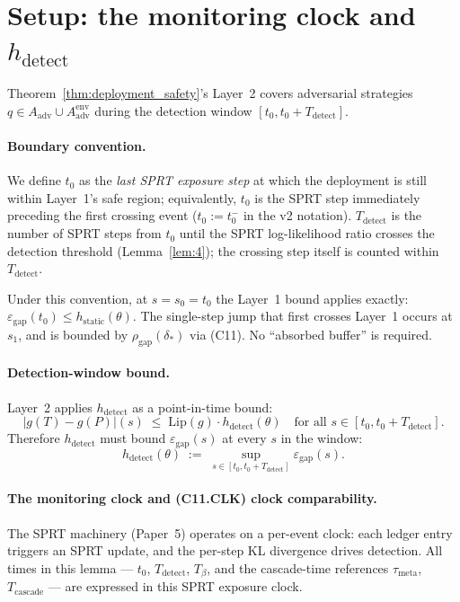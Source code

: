 \documentclass{article}
\newcommand{\Aadv}{A_{\mathrm{adv}}}
\newcommand{\deltastar}{\delta_{*}}
\newcommand{\rhogap}{\rho_{\mathrm{gap}}}
\newcommand{\Pproxy}{P}
\newcommand{\Ttruth}{T}
\newcommand{\epsgap}{\varepsilon_{\mathrm{gap}}}
\newcommand{\Tbeta}{T_{\beta}}
\begin{document}
\section{Setup: the monitoring clock and $h_{\mathrm{detect}}$}

Theorem~\ref{thm:deployment_safety}'s Layer~2 covers adversarial
strategies $q \in \Aadv \cup \Aadv^{\mathrm{env}}$ during the
detection window
$[t_0, t_0 + T_{\mathrm{detect}}]$.

\paragraph{Boundary convention.}  We define $t_0$ as the
\emph{last SPRT exposure step} at which the deployment is still
within Layer~1's safe region; equivalently, $t_0$ is the SPRT step
immediately preceding the first crossing event ($t_0 := t_0^-$ in
the v2 notation).  $T_{\mathrm{detect}}$ is the number of SPRT
steps from $t_0$ until the SPRT log-likelihood ratio crosses the
detection threshold (Lemma~\ref{lem:4}); the crossing step itself
is counted within $T_{\mathrm{detect}}$.

Under this convention, at $s = s_0 = t_0$ the Layer~1 bound applies
exactly: $\epsgap(t_0) \leq h_{\mathrm{static}}(\theta)$.  The
single-step jump that first crosses Layer~1 occurs at $s_1$, and is
bounded by $\rhogap(\deltastar)$ via (C11).  No ``absorbed buffer''
is required.

\paragraph{Detection-window bound.}
Layer~2 applies $h_{\mathrm{detect}}$ as a point-in-time bound:
\[
  |g(\Ttruth) - g(\Pproxy)|(s) \;\leq\; \mathrm{Lip}(g) \cdot
  h_{\mathrm{detect}}(\theta)
  \quad \text{for all } s \in [t_0, t_0 + T_{\mathrm{detect}}].
\]
Therefore $h_{\mathrm{detect}}$ must bound $\epsgap(s)$ at every
$s$ in the window:
\[
  h_{\mathrm{detect}}(\theta) \;:=\; \sup_{s \in
  [t_0, t_0 + T_{\mathrm{detect}}]} \epsgap(s).
\]

\paragraph{The monitoring clock and (C11.CLK) clock comparability.}
The SPRT machinery (Paper~5) operates on a per-event clock: each
ledger entry triggers an SPRT update, and the per-step KL divergence
drives detection.  All times in this lemma — $t_0$,
$T_{\mathrm{detect}}$, $\Tbeta$, and the cascade-time references
$\tau_{\mathrm{meta}}$, $T_{\mathrm{cascade}}$ — are expressed in
this SPRT exposure clock.
\end{document}

